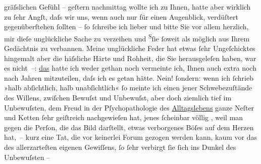 \begin{ledgroupsized}[t]{13cm}
                  {\pb}gräſslichen Gefühl – geſtern
               nachmittag wollte ich zu Ihnen, hatte aber wirklich zu ſehr Angſt, daſs wir uns, wenn
               auch nur für einen Augenblick, verdüſtert gegenüberſtehen ſollten – ſo ſchreibe ich
               lieber und bitte Sie vor allem herzlich, mir dieſe unglückliche Sache zu verzeihen
                  und{ }{\pb}\substVorne{}\textsuperscript{S}\substDazwischen{}ſ\substHinten{}ie ſoweit als möglich aus Ihrem Gedächtnis zu verbannen.\pend
           \pstart
           Meine unglückliche  Feder hat etwas ſehr
               Ungeſchicktes hingemalt aber die häſsliche Härte und Rohheit, die Sie herausgeleſen
               haben, war es nicht –: \uline{das} hatte ich weder gethan
               noch vermeinte ich, Ihnen auch extra noch nach {\pb}Jahren mitzuteilen, daſs ich es
               getan hätte. Nein! ſondern: wenn ich ſchrieb »halb abſichtlich, halb unabſichtlich«
               ſo meinte ich einen jener Schwebezuſtände des Willens, zwiſchen Bewuſst und
               Unbewuſst, aber doch ziemlich tief im Unbewuſsten, dem Freud in der Pſychopathologie des \uline{Alltagslebens} ganze Neſter und {\pb}Ketten
               ſehr geiſtreich nachgewieſen hat, jenes ſcheinbar völlig \label{K_L01978_1v}\label{K_L01978_1h}, weil man
               gegen die Perſon, die das Bild darſtellt, etwas verborgenes Böſes auf dem Herzen
               hat, – kurz eine Tat, die vor keinerlei Forum gezogen werden kann, kaum vor das des
               allerzarteſten eigenen Gewiſſens, ſo ſehr verbirgt ſie{ }{\pb}ſich ins Dunkel des Unbewuſsten –

\end{ledgroupsized}
